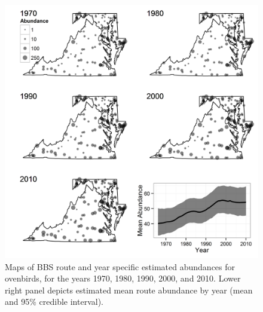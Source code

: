 \documentclass[12pt]{article}
\begin{document}
\begin{figure}
  \centering
  \includegraphics[width=6.6in]{figs/OVEN_N_by_route_year6}
\caption{Maps of BBS route and year specific estimated abundances for ovenbirds, for the years 1970,
1980, 1990, 2000, and 2010.  Lower right panel depicts estimated mean route abundance by year
(mean and 95\% credible interval).}
\label{fig:oven_N}
\end{figure}
\end{document}
